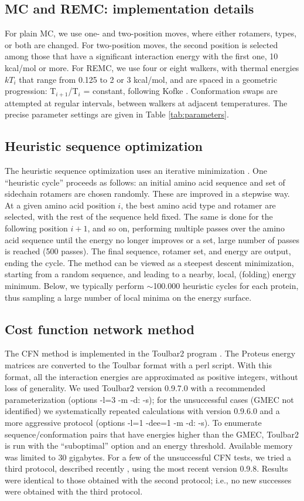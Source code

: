 \documentclass[a4paper,12pt]{article}
\begin{document}
\subsection{MC and REMC: implementation details}
For plain MC, we use one- and two-position moves, where either rotamers, types, or both are changed. For two-position
moves, the second position is selected among those that have a significant interaction energy with the first
one, 10 kcal/mol or more. For REMC, we use four or eight walkers, with thermal energies $kT_i$ that range from 0.125
to 2 or 3 kcal/mol, and are spaced in a geometric progression: T$_{i+1}$/T$_i$ = constant, following Kofke \cite{Kofke02}.
Conformation swaps are attempted at regular intervals, between walkers at adjacent temperatures. The precise parameter
settings are given in Table \ref{tab:parameters}.

\subsection{Heuristic sequence optimization}
The heuristic sequence optimization uses an iterative minimization \cite{Wernisch00,Schmidt08}. One ``heuristic cycle''
proceeds as follows: an initial amino acid sequence and set of sidechain rotamers are chosen randomly. These are
improved in a stepwise way. At a given amino acid position $i$, the best amino acid type and rotamer are selected,
with the rest of the sequence held fixed. The same is done for the following position $i+1$, and so on, performing
multiple passes over the amino acid sequence until the energy no longer improves or a set, large number of passes
is reached (500 passes). The final sequence, rotamer set, and energy are output, ending the cycle. The method can be
viewed as a steepest descent minimization, starting from a random sequence, and leading to a nearby, local, (folding)
energy minimum. Below, we typically perform ${\sim}$100.000 heuristic cycles for each protein, thus sampling a large
number of local minima on the energy surface. 

\subsection{Cost function network method}
The CFN method is implemented in the Toulbar2 program \cite{Traore13,Allouche14}. The Proteus energy matrices
are converted to the Toulbar format with a perl script. With this format, all the interaction energies are approximated
as positive integers, without loss of generality. We used Toulbar2 version 0.9.7.0 with a recommended parameterization
(options -l=3 -m -d: -s); for the unsuccessful cases (GMEC not identified) we systematically repeated calculations with
version 0.9.6.0 and a more aggressive protocol (options -l=1 -dee=1 -m -d: -s). To enumerate sequence/conformation pairs
that have energies higher than the GMEC, Toulbar2 is run with the ``suboptimal'' option and an energy threshold. Available
memory was limited to 30 gigabytes. For a few of the unsuccessful CFN tests, we tried a third protocol, described
recently \cite{Simoncini15}, using the most recent version 0.9.8. Results were identical to those obtained with the
second protocol; i.e., no new successes were obtained with the third protocol.
\end{document}
